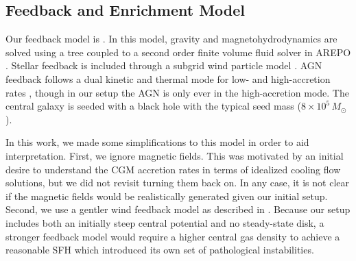 \documentclass[twocolumn,linenumbers,trackchanges]{aastex631}
\newcommand{\Msun}{\ensuremath{M_{\odot}}}
\begin{document}
\subsection{Feedback and Enrichment Model}\label{ssec:gfm}
Our feedback model is  \citep{2013MNRAS.436.3031V,2017MNRAS.465.3291W,2018MNRAS.473.4077P}. In this model, gravity and magnetohydrodynamics are solved using a \citet{1986Natur.324..446B} tree coupled to a second order finite volume fluid solver in AREPO \citep{2010MNRAS.401..791S,2016MNRAS.455.1134P}. Stellar feedback is included through a subgrid wind particle model \citep{2003MNRAS.339..289S}. AGN feedback follows a dual kinetic and thermal mode for low- and high-accretion rates \citep{2017MNRAS.465.3291W}, though in our setup the AGN is only ever in the high-accretion mode. The central galaxy is seeded with a black hole with the typical seed mass ($8\times10^5\,\Msun$). 

In this work, we made some simplifications to this model in order to aid interpretation. First, we ignore magnetic fields. This was motivated by an initial desire to understand the CGM accretion rates in terms of idealized cooling flow solutions, but we did not revisit turning them back on. In any case, it is not clear if the magnetic fields would be realistically generated given our initial setup. Second, we use a gentler wind feedback model as described in \citet{2019MNRAS.489.4233M}. Because our setup includes both an initially steep central potential and no steady-state disk, a stronger feedback model would require a higher central gas density to achieve a reasonable SFH which introduced its own set of pathological instabilities.
\end{document}
